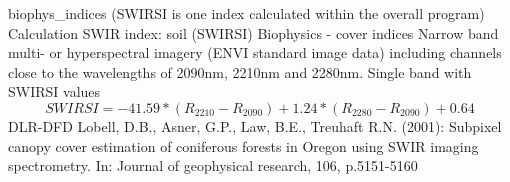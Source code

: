 %
{ %
biophys\_indices (SWIRSI is one index calculated within the overall program)
}
%
{ %
Calculation SWIR index: soil (SWIRSI)
}
%
{ %
Biophysics - cover indices
}
%
{ %
Narrow band multi- or hyperspectral imagery (ENVI standard image data) including channels close to the wavelengths of 2090nm, 2210nm and 2280nm.\bigskip
}
%
{ %
Single band with SWIRSI values
}
%
{ %
\begin{displaymath}
SWIRSI= -41.59 * (R_{2210}-R_{2090}) + 1.24 * (R_{2280} - R_{2090}) + 0.64
\end{displaymath}
}
%
{ %
DLR-DFD
}
%
{ %
Lobell, D.B., Asner, G.P., Law, B.E., Treuhaft R.N. (2001): Subpixel canopy cover estimation of coniferous forests in Oregon using SWIR imaging spectrometry. In: Journal of geophysical research, 106, p.5151-5160
}
